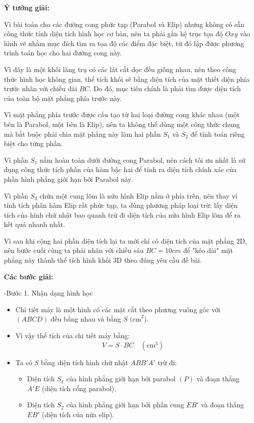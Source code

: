 \documentclass[12pt,a4paper,oneside]{book}
\theoremstyle{theorem}
\theoremstyle{definition}
\begin{document}
\begin{center}
    \textbf{Ý tưởng giải:}
\end{center}

Vì bài toán cho các đường cong phức tạp (Parabol và Elip) nhưng không có sẵn công thức tính diện tích hình học cơ bản, nên ta phải gắn hệ trục tọa độ $Oxy$ vào hình vẽ nhằm mục đích tìm ra tọa độ các điểm đặc biệt, từ đó lập được phương trình toán học cho hai đường cong này.

Vì đây là một khối lăng trụ có các lát cắt dọc đều giống nhau, nên theo công thức hình học không gian, thể tích khối sẽ bằng diện tích của mặt thiết diện phía trước nhân với chiều dài $BC$. Do đó, mục tiêu chính là phải tìm được diện tích của toàn bộ mặt phẳng phía trước này.

Vì mặt phẳng phía trước được cấu tạo từ hai loại đường cong khác nhau (một bên là Parabol, một bên là Elip), nên ta không thể dùng một công thức chung mà bắt buộc phải chia mặt phẳng này làm hai phần $S_{1}$ và $S_{2}$ để tính toán riêng biệt cho từng phần.

Vì phần $S_{1}$ nằm hoàn toàn dưới đường cong Parabol, nên cách tối ưu nhất là sử dụng công thức tích phân của hàm bậc hai để tính ra diện tích chính xác của phần hình phẳng giới hạn bởi Parabol này.

Vì phần $S_{2}$ chứa một cung lõm là nửa hình Elip nằm ở phía trên, nên thay vì tính tích phân hàm Elip rất phức tạp, ta dùng phương pháp loại trừ: lấy diện tích của hình chữ nhật bao quanh trừ đi diện tích của nửa hình Elip lõm để ra kết quả nhanh nhất.

Vì sau khi cộng hai phần diện tích lại ta mới chỉ có diện tích của mặt phẳng 2D, nên bước cuối cùng ta phải nhân với chiều sâu $BC = 10 cm$ để "kéo dài" mặt phẳng này thành thể tích hình khối 3D theo đúng yêu cầu đề bài.

\begin{center}
    \textbf{Các bước giải:}
\end{center}

-Bước 1. Nhận dạng hình học
\begin{itemize}
    \item Chi tiết máy là một hình có các mặt cắt theo phương vuông góc với $(ABCD)$ đều bằng nhau và bằng $S\text{ (cm}^2\text{)}$.
    \item Vì vậy thể tích của chi tiết máy bằng:
    \[
    V = S \cdot BC \quad (\text{cm}^3)
    \]
    \item Ta có $S$ bằng diện tích hình chữ nhật $ABB'A'$ trừ đi:
    \begin{itemize}
        \item[+] Diện tích $S_1$ của hình phẳng giới hạn bởi parabol $(P)$ và đoạn thẳng $A'E$ (diện tích cổng parabol).
        \item[+] Diện tích $S_2$ của hình phẳng giới hạn bởi phần cung $EB'$ và đoạn thẳng $EB'$ (diện tích của nửa elip).
    \end{itemize}
\end{itemize}
\end{document}
